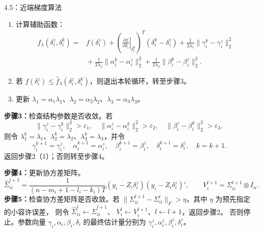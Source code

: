 \begin{bookalgorithm}{4.5：近端梯度算法}
\begin{enumerate}
\[\alpha_i^z=\begin{bmatrix}\alpha_{i1}^z\\\vdots\\\alpha_{il_i}^z\end{bmatrix},\quad
\beta_i^z=\begin{bmatrix}\beta_{i1}^z\\\vdots\\\beta_{ik_i}^z\end{bmatrix},\quad
\delta_i^z=\begin{bmatrix}\gamma_i^z\\\alpha_i^z\\\beta_i^z\end{bmatrix}.
\]
\item 计算辅助函数：
\[
\begin{aligned}
f_\lambda(\delta_i^z,\delta_i^k)={}&f(\delta_i^z)
+\left(\left.\frac{\partial f}{\partial\delta_i}\right|_{\delta_i^k}\right)^T
 (\delta_i^k-\delta_i^z)
+\frac{1}{2\lambda_1}\|\gamma_i^k-\gamma_i^z\|_2^2\\
&{}+\frac{1}{2\lambda_2}\|\alpha_i^k-\alpha_i^z\|_2^2
+\frac{1}{2\lambda_3}\|\beta_i^k-\beta_i^z\|_2^2.
\end{aligned}
\]
\item 若 $f(\delta_i^z)\le\widehat f_\lambda(\delta_i^z,\delta_i^k)$，则退出本轮循环，转至步骤3。
\item 更新 $\lambda_1=\alpha_1\lambda_1$、$\lambda_2=\alpha_2\lambda_2$、$\lambda_3=\alpha_3\lambda_3$。
\end{enumerate}
\textbf{步骤3：}检查结构参数是否收敛。若
\[
\|\gamma_i^z-\gamma_i^k\|_2^2>\varepsilon_1,\quad
\|\alpha_i^z-\alpha_i^k\|_2^2>\varepsilon_2,\quad
\|\beta_i^z-\beta_i^k\|_2^2>\varepsilon_3,
\]
则令 $\lambda_1^k=\lambda_1$、$\lambda_2^k=\lambda_2$、$\lambda_3^k=\lambda_3$，并令
\[
\gamma_i^{k+1}=\gamma_i^z,\quad\alpha_i^{k+1}=\alpha_i^z,\quad
\beta_i^{k+1}=\beta_i^z,\quad\delta_i^{k+1}=\delta_i^z,\quad k=k+1.
\]
返回步骤2（1）；否则转至步骤4。

\textbf{步骤4：}更新协方差矩阵。
\[
\widehat\Sigma_{ii}^{l+1}=\frac{1}{(n-m_i+1-l_i-k_i)T}
(y_i-Z_i\delta_i^z)(y_i-Z_i\delta_i^z)',\qquad
V_i^{l+1}=\Sigma_{ii}^{l+1}\otimes I_n.
\]
\textbf{步骤5：}检查协方差矩阵是否收敛。若
$\|\Sigma_{ii}^{l+1}-\Sigma_{ii}^{l}\|_F>\eta$，其中 $\eta$ 为预先指定的小容许误差，
则令 $\widehat\Sigma_{ii}^{l}\leftarrow\widehat\Sigma_{ii}^{l+1}$、
$V_i^l\leftarrow V_i^{l+1}$、$l\leftarrow l+1$，返回步骤2。
否则停止。参数向量 $\gamma_i,\alpha_i,\beta_i,\delta_i$ 的最终估计量分别为
$\gamma_i^z,\alpha_i^z,\beta_i^z,\delta_i^z$。
\end{bookalgorithm}
